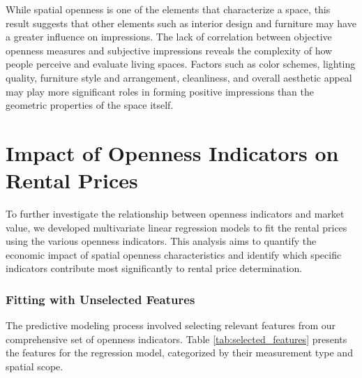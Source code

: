 While spatial openness is one of the elements that characterize a space, this result suggests that 
other elements such as interior design and furniture may have a greater influence on impressions. The 
lack of correlation between objective openness measures and subjective impressions reveals the 
complexity of how people perceive and evaluate living spaces. Factors such as color schemes, lighting 
quality, furniture style and arrangement, cleanliness, and overall aesthetic appeal may play more 
significant roles in forming positive impressions than the geometric properties of the space itself.




\section{Impact of Openness Indicators on Rental Prices}

To further investigate the relationship between openness indicators and market value, we developed 
multivariate linear regression models to fit the rental prices using the various openness indicators. 
This analysis aims to quantify the economic impact of spatial openness characteristics and identify 
which specific indicators contribute most significantly to rental price determination.

\subsubsection{Fitting with Unselected Features }
The predictive modeling process involved selecting relevant features from our comprehensive set of 
openness indicators. Table \ref{tab:selected_features} presents the features for the 
regression model, categorized by their measurement type and spatial scope.

